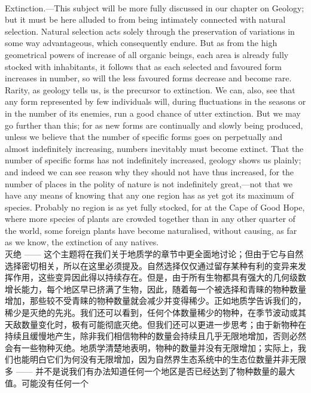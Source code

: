 \documentclass{article}
\begin{document}
\\
Extinction.—This subject will be more fully discussed in our chapter on Geology; but it must be here alluded to from being intimately connected with natural selection. Natural selection acts solely through the preservation of variations in some way advantageous, which consequently endure. But as from the high geometrical powers of increase of all organic beings, each area is already fully stocked with inhabitants, it follows that as each selected and favoured form increases in number, so will the less favoured forms decrease and become rare. Rarity, as geology tells us, is the precursor to extinction. We can, also, see that any form represented by few individuals will, during fluctuations in the seasons or in the number of its enemies, run a good chance of utter extinction. But we may go further than this; for as new forms are continually and slowly being produced, unless we believe that the number of specific forms goes on perpetually and almost indefinitely increasing, numbers inevitably must become extinct. That the number of specific forms has not indefinitely increased, geology shows us plainly; and indeed we can see reason why they should not have thus increased, for the number of places in the polity of nature is not indefinitely great,—not that we have any means of knowing that any one region has as yet got its maximum of species. Probably no region is as yet fully stocked, for at the Cape of Good Hope, where more species of plants are crowded together than in any other quarter of the world, some foreign plants have become naturalised, without causing, as far as we know, the extinction of any natives.\\
灭绝 —— 这个主题将在我们关于地质学的章节中更全面地讨论；但由于它与自然选择密切相关，所以在这里必须提及。自然选择仅仅通过留存某种有利的变异来发挥作用，这些变异因此得以持续存在。但是，由于所有生物都具有强大的几何级数增长能力，每个地区早已挤满了生物，因此，随着每一个被选择和青睐的物种数量增加，那些较不受青睐的物种数量就会减少并变得稀少。正如地质学告诉我们的，稀少是灭绝的先兆。我们还可以看到，任何个体数量稀少的物种，在季节波动或其天敌数量变化时，极有可能彻底灭绝。但我们还可以更进一步思考；由于新物种在持续且缓慢地产生，除非我们相信物种的数量会持续且几乎无限地增加，否则必然会有一些物种灭绝。地质学清楚地表明，物种的数量并没有无限增加；实际上，我们也能明白它们为何没有无限增加，因为自然界生态系统中的生态位数量并非无限多 —— 并不是说我们有办法知道任何一个地区是否已经达到了物种数量的最大值。可能没有任何一个\\
\end{document}
